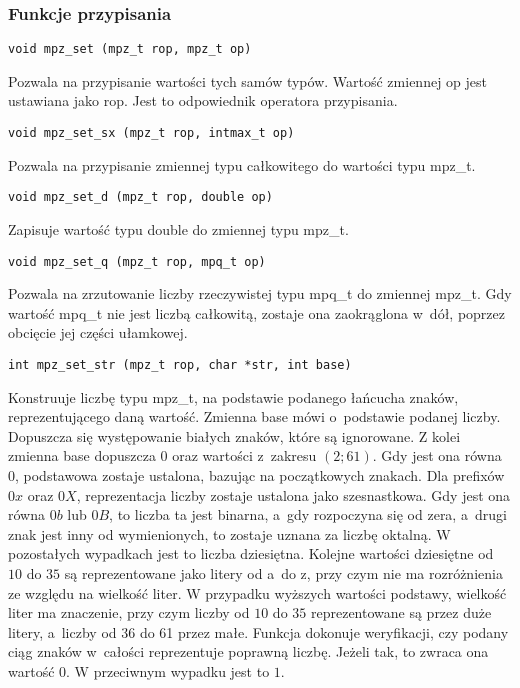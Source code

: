 \subsubsection{Funkcje przypisania}

\begin{lstlisting}
void mpz_set (mpz_t rop, mpz_t op)
\end{lstlisting}

Pozwala na przypisanie wartości tych samów typów. Wartość zmiennej op jest ustawiana jako rop. Jest to odpowiednik operatora przypisania.

\begin{lstlisting}
void mpz_set_sx (mpz_t rop, intmax_t op)
\end{lstlisting}

Pozwala na przypisanie zmiennej typu całkowitego do wartości typu mpz\_t.

\begin{lstlisting}
void mpz_set_d (mpz_t rop, double op)
\end{lstlisting}

Zapisuje wartość typu double do zmiennej typu mpz\_t.

\begin{lstlisting}
void mpz_set_q (mpz_t rop, mpq_t op)
\end{lstlisting}

Pozwala na zrzutowanie liczby rzeczywistej typu mpq\_t do zmiennej mpz\_t. Gdy wartość mpq\_t nie jest liczbą całkowitą, zostaje ona zaokrąglona w~dół, poprzez obcięcie jej części ułamkowej.

\begin{lstlisting}
int mpz_set_str (mpz_t rop, char *str, int base)
\end{lstlisting}

Konstruuje liczbę typu mpz\_t, na podstawie podanego łańcucha znaków, reprezentującego daną wartość. Zmienna base mówi o~podstawie podanej liczby. Dopuszcza się występowanie białych znaków, które są ignorowane. Z kolei zmienna base dopuszcza $0$ oraz wartości z~zakresu $(2;61)$. Gdy jest ona równa $0$, podstawowa zostaje ustalona, bazując na początkowych znakach. Dla prefixów $0x$ oraz $0X$, reprezentacja liczby zostaje ustalona jako szesnastkowa. Gdy jest ona równa $0b$ lub $0B$, to liczba ta jest binarna, a~gdy rozpoczyna się od zera, a~drugi znak jest inny od wymienionych, to zostaje uznana za liczbę oktalną. W pozostałych wypadkach jest to liczba dziesiętna. Kolejne wartości dziesiętne od $10$ do $35$ są reprezentowane jako litery od a~do z, przy czym nie ma rozróżnienia ze względu na wielkość liter. W przypadku wyższych wartości podstawy, wielkość liter ma znaczenie, przy czym liczby od $10$ do $35$ reprezentowane są przez duże litery, a~liczby od 36 do 61 przez małe. Funkcja dokonuje weryfikacji, czy podany ciąg znaków w~całości reprezentuje poprawną liczbę. Jeżeli tak, to zwraca ona wartość $0$. W przeciwnym wypadku jest to $1$.

